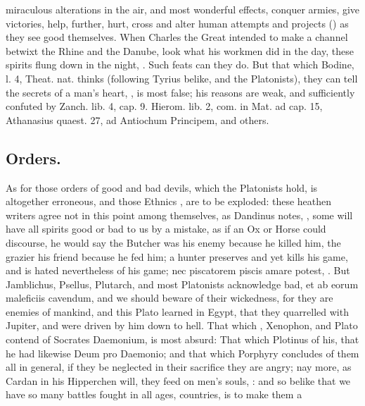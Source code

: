 {{miraculous alterations in the air, and most wonderful effects, conquer
armies, give victories, help, further, hurt, cross and alter human
attempts and projects () as they see good themselves.
When Charles the Great intended to make a channel betwixt the
Rhine and the Danube, look what his workmen did in the day, these
spirits flung down in the night, .
Such feats can they do. But that which Bodine, l. 4, Theat. nat. thinks
(following Tyrius belike, and the Platonists), they can tell the
secrets of a man's heart, , is most false; his
reasons are weak, and sufficiently confuted by Zanch. lib. 4, cap. 9.
Hierom. lib. 2, com. in Mat. ad cap. 15, Athanasius quaest. 27, ad
Antiochum Principem, and others.

\subsection{Orders.}
As for those orders of good and bad devils, which the
Platonists hold, is altogether erroneous, and those Ethnics , are to be exploded: these heathen writers agree not in this
point among themselves, as Dandinus notes, , some will have all spirits good or bad to us by a mistake,
as if an Ox or Horse could discourse, he would say the Butcher was his
enemy because he killed him, the grazier his friend because he fed him;
a hunter preserves and yet kills his game, and is hated nevertheless of
his game; nec piscatorem piscis amare potest, \etc{}. But Jamblichus,
Psellus, Plutarch, and most Platonists acknowledge bad, et ab eorum
maleficiis cavendum, and we should beware of their wickedness, for they
are enemies of mankind, and this Plato learned in Egypt, that they
quarrelled with Jupiter, and were driven by him down to hell.
That which \Apuleius{}, Xenophon, and Plato contend of
Socrates Daemonium, is most absurd: That which Plotinus of his, that he
had likewise Deum pro Daemonio; and that which Porphyry concludes of
them all in general, if they be neglected in their sacrifice they are
angry; nay more, as Cardan in his Hipperchen will, they feed on men's
souls, : and so belike that we
have so many battles fought in all ages, countries, is to make them a
}}
